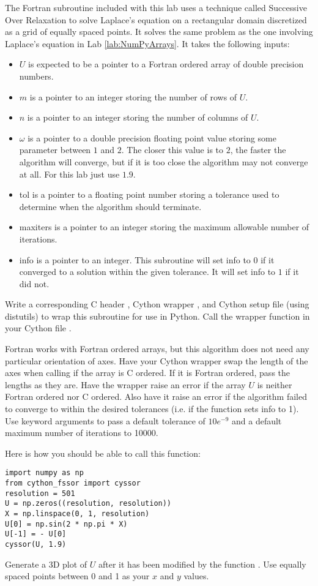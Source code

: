 \begin{problem}
The Fortran subroutine  included with this lab uses a technique called Successive Over Relaxation to solve Laplace's equation on a rectangular domain discretized as a grid of equally spaced points.
It solves the same problem as the one involving Laplace's equation in Lab \ref{lab:NumPyArrays}.
It takes the following inputs:
\begin{itemize}
\item $U$ is expected to be a pointer to a Fortran ordered array of double precision numbers.
\item $m$ is a pointer to an integer storing the number of rows of $U$.
\item $n$ is a pointer to an integer storing the number of columns of $U$.
\item $\omega$ is a pointer to a double precision floating point value storing some parameter between $1$ and $2$.
The closer this value is to $2$, the faster the algorithm will converge, but if it is too close the algorithm may not converge at all.
For this lab just use $1.9$.
\item tol is a pointer to a floating point number storing a tolerance used to determine when the algorithm should terminate.
\item maxiters is a pointer to an integer storing the maximum allowable number of iterations.
\item info is a pointer to an integer.
This subroutine will set info to $0$ if it converged to a solution within the given tolerance.
It will set info to $1$ if it did not.
\end{itemize}

Write a corresponding C header , Cython wrapper , and Cython setup file (using distutils)  to wrap this subroutine for use in Python.
Call the wrapper function in your Cython file .

Fortran works with Fortran ordered arrays, but this algorithm does not need any particular orientation of axes.
Have your Cython wrapper swap the length of the axes when calling  if the array is C ordered.
If it is Fortran ordered, pass the lengths as they are.
Have the wrapper raise an error if the array $U$ is neither Fortran ordered nor C ordered.
Also have it raise an error if the algorithm failed to converge to within the desired tolerances (i.e. if the function sets info to 1).
Use keyword arguments to pass  a default tolerance of $10e^{-9}$ and a default maximum number of iterations to 10000.

Here is how you should be able to call this function:
\begin{lstlisting}
import numpy as np
from cython_fssor import cyssor
resolution = 501
U = np.zeros((resolution, resolution))
X = np.linspace(0, 1, resolution)
U[0] = np.sin(2 * np.pi * X)
U[-1] = - U[0]
cyssor(U, 1.9)
\end{lstlisting}

Generate a 3D plot of $U$ after it has been modified by the function .
Use equally spaced points between 0 and 1 as your $x$ and $y$ values.
\end{problem}

